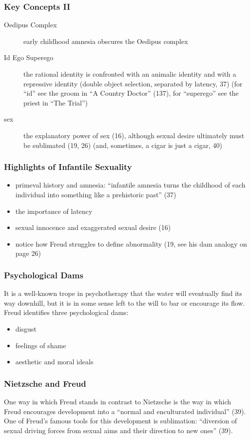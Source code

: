 \documentclass[xcolor=dvipsnames]{beamer}
\begin{document}
\begin{frame}
  \frametitle{Key Concepts II} 
  \begin{description}
  \item[Oedipus Complex] early childhood amnesia obscures the Oedipus
    complex
  \item[Id Ego Superego] the rational identity is confronted with an
    animalic identity and with a repressive identity (double object
    selection, separated by latency, 37) (for ``id'' see the groom in
    ``A Country Doctor'' (137), for ``superego'' see the priest in ``The
    Trial'')
  \item[sex] the explanatory power of sex (16), although sexual desire
    ultimately must be sublimated (19, 26) (and, sometimes, a cigar is
    just a cigar, 40)
  \end{description}
\end{frame}

\begin{frame}
  \frametitle{Highlights of Infantile Sexuality} 
  \begin{itemize}
  \item primeval history and amnesia: ``infantile amnesia turns the
    childhood of each individual into something like a prehistoric
    past'' (37)
  \item the importance of latency
  \item sexual innocence and exaggerated sexual desire (16)
  \item notice how Freud struggles to define abnormality (19, see his
    dam analogy on page 26)
  \end{itemize}
\end{frame}

\begin{frame}
  \frametitle{Psychological Dams}
  It is a well-known trope in psychotherapy that the water will
  eventually find its way downhill, but it is in some sense left to
  the will to bar or encourage its flow. Freud identifies three
  psychological dams:
  \begin{itemize}
  \item disgust
  \item feelings of shame
  \item aesthetic and moral ideals
  \end{itemize}
\end{frame}

\begin{frame}
  \frametitle{Nietzsche and Freud}
  One way in which Freud stands in contrast to Nietzsche is the way in
  which Freud encourages development into a ``normal and enculturated
  individual'' (39). One of Freud's famous tools for this development
  is \alert{sublimation}: ``diversion of sexual driving forces from
  sexual aims and their direction to new ones'' (39). 
\end{frame}
\end{document}
